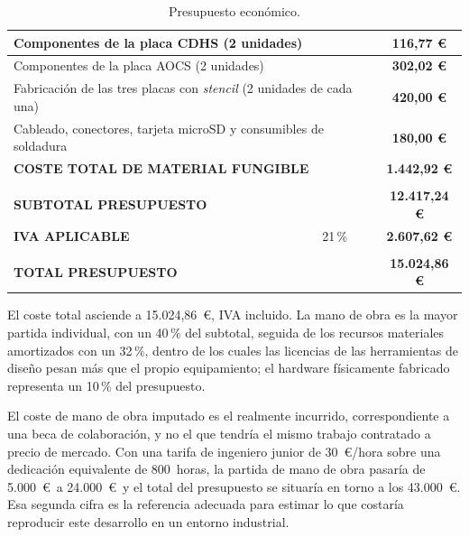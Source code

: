 \begin{table}[H]
{\begin{tabular}{lllllc}
\multicolumn{5}{|l|}{Componentes de la placa CDHS (2 unidades)} &
\multicolumn{1}{c|}{\textbf{116,77 \euro}} \\
\hline

\multicolumn{5}{|l|}{Componentes de la placa AOCS (2 unidades)} &
\multicolumn{1}{c|}{\textbf{302,02 \euro}} \\
\hline

\multicolumn{5}{|l|}{Fabricación de las tres placas con \textit{stencil} (2 unidades de cada una)} &
\multicolumn{1}{c|}{\textbf{420,00 \euro}} \\
\hline

\multicolumn{5}{|l|}{Cableado, conectores, tarjeta microSD y consumibles de soldadura} &
\multicolumn{1}{c|}{\textbf{180,00 \euro}} \\
\hline

\multicolumn{5}{|l|}{\textbf{COSTE TOTAL DE MATERIAL FUNGIBLE}} &
\multicolumn{1}{c|}{\textbf{1.442,92 \euro}} \\
\hline

& & & & &
\multicolumn{1}{l}{} \\
\hline

\multicolumn{5}{|l|}{\textbf{SUBTOTAL PRESUPUESTO}} &
\multicolumn{1}{c|}{\textbf{12.417,24 \euro}} \\
\hline

\multicolumn{4}{|l|}{\textbf{IVA APLICABLE}} &
\multicolumn{1}{c|}{21\,\%} &
\multicolumn{1}{c|}{\textbf{2.607,62 \euro}} \\
\hline

& & & & &
\multicolumn{1}{l}{} \\
\hline

\multicolumn{5}{|l|}{\textbf{TOTAL PRESUPUESTO}} &
\multicolumn{1}{c|}{\textbf{15.024,86 \euro}} \\
\hline

\end{tabular}}
    \caption{Presupuesto económico.}
    \label{presupuesto-economico}

\end{table}

El coste total asciende a 15.024,86~\euro, IVA incluido. La mano de obra es la mayor partida 
individual, con un 40\,\% del
subtotal, seguida de los recursos materiales amortizados con un 32\,\%, dentro de los cuales las
licencias de las herramientas de diseño pesan más que el propio equipamiento; el hardware
físicamente fabricado representa un 10\,\% del presupuesto.

El coste de mano de obra imputado es el realmente incurrido, correspondiente a una beca de
colaboración, y no el que tendría el mismo trabajo contratado a precio de mercado. Con
una tarifa de ingeniero junior de 30~\euro/hora sobre una dedicación equivalente de 800~horas, la
partida de mano de obra pasaría de 5.000~\euro\ a 24.000~\euro\ y el total del presupuesto se
situaría en torno a los 43.000~\euro. Esa segunda cifra es la referencia adecuada para estimar lo
que costaría reproducir este desarrollo en un entorno industrial.
